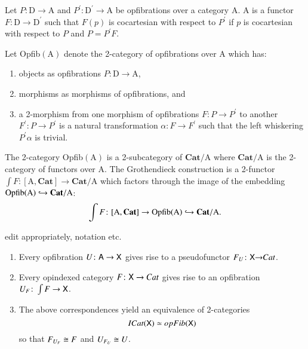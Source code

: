 \documentclass{amsart}
\begin{document}
\begin{defn}
Let $P \colon \mathrm{D} \to \mathrm{A}$ and $P^\prime \colon \mathrm{D^\prime} \to \mathrm{A}$ be opfibrations over a category $\mathrm{A}$. A  is a functor $F \colon \mathrm{D} \to \mathrm{D}^\prime$ such that $F(p)$ is cocartesian with respect to $P^\prime$ if $p$ is cocartesian with respect to $P$ and $P=P^\prime F$.
\end{defn}

Let Opfib$(\mathrm{A})$ denote the 2-category of opfibrations over $\mathrm{A}$ which has:
\begin{enumerate}
\item{objects as opfibrations $P \colon \mathrm{D} \to \mathrm{A}$,}
\item{morphisms as morphisms of opfibrations, and}
\item{a 2-morphism from one morphism of opfibrations $F \colon P \to P^\prime$ to another $F^\prime \colon P \to P^\prime$ is a natural transformation $\alpha \colon F \to F^\prime$ such that the left whiskering $P^\prime \alpha$ is trivial.}
\end{enumerate}

The 2-category Opfib$(\mathrm{A})$ is a 2-subcategory of $\mathbf{Cat}/ \mathrm{A}$ where $\mathbf{Cat} / \mathrm{A}$ is the 2-category of functors over $\mathrm{A}$. The Grothendieck construction is a 2-functor $\int F \colon [ \mathrm{A},\mathbf{Cat}] \to \mathbf{Cat}/ \mathrm{A}$ which factors through the image of the embedding $\textnormal{Opfib}(\mathrm{A}) \hookrightarrow \mathbf{Cat} / \mathrm{A}$: $$\int F \colon [ \mathrm{A}, \mathbf{Cat} ] \to \textnormal{Opfib}(\mathrm{A}) \hookrightarrow \mathbf{Cat} / \mathrm{A}.$$

{\chris edit appropriately, notation etc.}
\begin{thm}\label{thm:Grothendieck}
    \begin{enumerate}
        \item Every opfibration $U \colon \mathsf{A} \to \mathsf{X}$ gives rise to a pseudofunctor $F_U \colon \mathsf{X} {\to}Cat$.
        \item Every opindexed category $F \colon \mathsf{X} \to Cat$ gives rise to  an opfibration $U_F \colon \int F\to\mathsf{X}$.
        \item The above correspondences yield an equivalence of 2-categories 
        \begin{displaymath}
            ICat(\mathsf{X}) \simeq opFib(\mathsf{X})
        \end{displaymath}
        so that $F_{U_F} \cong F$ and $U_{F_U} \cong U$.
    \end{enumerate}
\end{thm}
\end{document}
